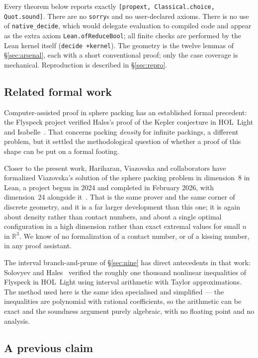 \documentclass[11pt,a4paper]{article}
\theoremstyle{plain}
\theoremstyle{definition}
\newcommand{\R}{\mathbb{R}}
\begin{document}
Every theorem below reports exactly \texttt{[propext, Classical.choice, Quot.sound]}.
There are no \texttt{sorry}s and no user-declared axioms. There is no use of
\texttt{native\_decide}, which would delegate evaluation to compiled code and appear as
the extra axiom \texttt{Lean.ofReduceBool}; all finite checks are performed by the Lean
kernel itself (\texttt{decide +kernel}). The geometry is the twelve lemmas of
\S\ref{sec:arsenal}, each with a short conventional proof; only the case coverage is
mechanical. Reproduction is described in \S\ref{sec:repro}.

\subsection*{Related formal work}

Computer-assisted proof in sphere packing has an established formal precedent: the
Flyspeck project verified Hales's proof of the Kepler conjecture in HOL~Light and
Isabelle~\cite{Flyspeck2017}. That concerns packing \emph{density} for infinite
packings, a different problem, but it settled the methodological question of whether a
proof of this shape can be put on a formal footing.

Closer to the present work, Hariharan, Viazovska and collaborators have formalized
Viazovska's solution of the sphere packing problem in dimension~8 in Lean, a project
begun in 2024 and completed in February 2026, with dimension~24 alongside
it~\cite{SpherePacking8Lean2026}. That is the same prover and the same corner of discrete
geometry, and it is a far larger development than this one; it is again about density
rather than contact numbers, and about a single optimal configuration in a high dimension
rather than exact extremal values for small $n$ in $\R^3$. We know of no formalization of
a contact number, or of a kissing number, in any proof assistant.

The interval branch-and-prune of \S\ref{sec:nine} has direct antecedents in that work:
Solovyev and Hales~\cite{SolovyevHales2013} verified the roughly one thousand nonlinear
inequalities of Flyspeck in HOL~Light using interval arithmetic with Taylor
approximations. The method used here is the same idea specialised and simplified --- the
inequalities are polynomial with rational coefficients, so the arithmetic can be exact
and the soundness argument purely algebraic, with no floating point and no analysis.

\subsection*{A previous claim}
\end{document}
